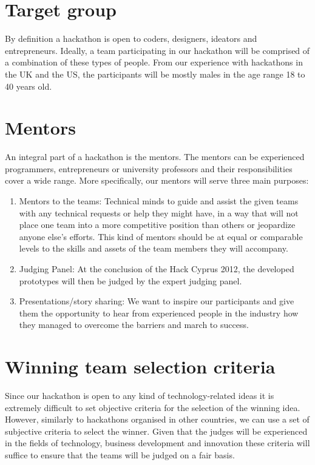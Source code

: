 \documentclass[a4paper,11pt]{report}
\begin{document}
\section{Target group}
By definition a hackathon is open to coders, designers, ideators and entrepreneurs. Ideally, a team participating in our hackathon will
be comprised of a combination of these types of people. From our experience with hackathons in the UK and the US, the participants will be mostly males in the age range 18 to 40 years old.   

\section{Mentors}
An integral part of a hackathon is the mentors. The mentors can be experienced programmers, entrepreneurs or university professors and their responsibilities cover a wide range. More specifically, our mentors will serve three main purposes:
\begin{enumerate}
  \item Mentors to the teams: Technical minds to guide and assist the given teams with any technical requests or help they might have, in a way that will not place one team into a more competitive position than others or jeopardize anyone else’s efforts. This kind of mentors should   be at equal or comparable levels to the skills and assets of the team members they will accompany.
  \item Judging Panel: At the conclusion of the Hack Cyprus 2012, the developed prototypes will then be judged by the expert judging panel.
  \item Presentations/story sharing: We want to inspire our participants and give them the opportunity to hear from experienced people in the industry how they managed to overcome the barriers and march to success. 
\end{enumerate}

\section{Winning team selection criteria}
Since our hackathon is open to any kind of technology-related ideas it is extremely difficult to set objective criteria for the selection of the winning idea. However, similarly to hackathons organised in other countries, we can use a set of subjective criteria to select the winner. Given that the judges will be experienced in the fields of technology, business development and innovation these criteria will suffice to ensure that the teams will be judged on a fair basis.
\end{document}
